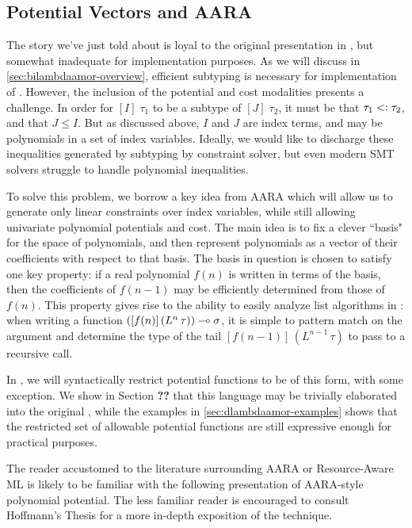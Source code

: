 \subsection{Potential Vectors and AARA}
The story we've just told about \lambdaamor is loyal to the original presentation in \citep{rajani-et-al:popl21}, but somewhat inadequate for implementation purposes. As we will discuss in \autoref{sec:bilambdaamor-overview}, efficient subtyping is necessary for implementation of \lambdaamor. However,
the inclusion of the potential and cost modalities presents a challenge. In order for $[I] \; \tau_1$ to be a subtype of $[J] \; \tau_2$, it must be that $\tau_1 <: \tau_2$, and that $J \leq I$. But as discussed above, $I$ and $J$ are index terms, and may be polynomials in a set of index variables. Ideally, we would like to discharge these inequalities generated by subtyping by constraint solver, but even modern SMT solvers struggle to handle polynomial inequalities.

To solve this problem, we borrow a key idea from AARA \cite{hoffmann-et-al:esop10} which will allow us to generate only linear constraints over index variables, while still allowing univariate polynomial potentials and cost. The main idea is to fix a clever ``basis" for the space of polynomials, and then represent polynomials as a vector of their coefficients with respect to that basis. The basis in question is chosen to satisfy one key property: if a real polynomial $f(n)$ is written in terms of the basis, then the coefficients of $f(n-1)$ may be efficiently determined from those of $f(n)$. This property gives rise to the ability to easily analyze list algorithms in \lambdaamor: when writing a function $([f(n)] \, (L^n \, \tau)) \multimap \sigma$, it is simple to pattern match on the argument and determine the type of the tail $[f(n-1)] \, (L^{n-1} \, \tau)$ to pass to a recursive call.

In \dlambdaamor, we will syntactically restrict potential functions to be of this form, with some exception. We show in Section \textbf{??} that this language may be trivially elaborated into the original \lambdaamor, while the examples in \autoref{sec:dlambdaamor-examples} shows that the restricted set of allowable potential functions are still expressive enough for practical purposes.

The reader accustomed to the literature surrounding AARA or Resource-Aware ML is likely to be familiar with the following presentation of AARA-style polynomial potential. The less familiar reader is encouraged to consult Hoffmann's Thesis \cite{hoffmann:thesis} for a more in-depth exposition of the technique.

